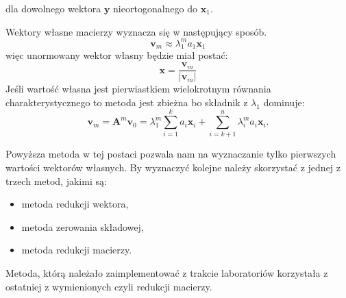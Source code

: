 \documentclass{article}
\begin{document}
dla dowolnego wektora $\textbf{y}$ nieortogonalnego do $\textbf{x}_1$. 
\par Wektory własne macierzy wyznacza się w następujący sposób. 
\begin{equation}
\textbf{v}_m \approx \lambda_1 ^m a_1 \textbf{x}_1
\end{equation}
więc unormowany wektor własny będzie miał postać:
\begin{equation}
\textbf{x} = \frac{\textbf{v}_m}{|\textbf{v}_m |}
\end{equation}
Jeśli wartość własna jest pierwiastkiem wielokrotnym równania charakterystycznego to metoda jest zbieżna bo składnik z $\lambda_1$ dominuje:
\begin{equation}
\textbf{v}_m = \textbf{A}^m \textbf{v}_0 = \lambda_1 ^m \displaystyle\sum_{i=1}^{k} a_i \textbf{x}_i + \displaystyle\sum_{i=k+1}^{n} \lambda_i ^m a_i \textbf{x}_i .
\end{equation}
\par Powyższa metoda w tej postaci pozwala nam na wyznaczanie tylko pierwszych wartości wektorów własnych. By wyznaczyć kolejne należy skorzystać z jednej z trzech metod, jakimi są:
\begin{itemize}
	\item metoda redukcji wektora,
	\item metoda zerowania składowej,
	\item metoda redukcji macierzy.
\end{itemize}
Metoda, którą należało zaimplementować z trakcie laboratoriów korzystała z ostatniej z wymienionych czyli redukcji macierzy. 
\end{document}

